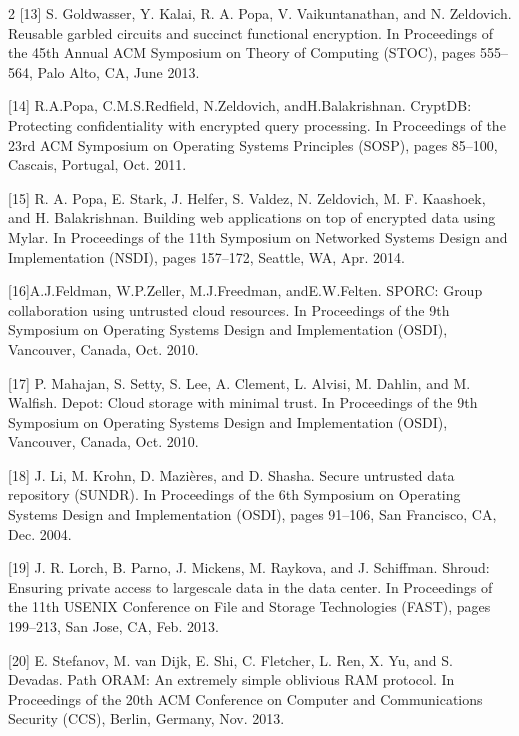 \documentclass[12pt,a4paper]{article}
\begin{document}
\begin{multicols}{2}
[13] S. Goldwasser, Y. Kalai, R. A. Popa, V. Vaikuntanathan, and N. Zeldovich. Reusable garbled circuits and succinct functional encryption. In Proceedings of the 45th Annual ACM Symposium on Theory of Computing (STOC), pages 555–564, Palo Alto, CA, June 2013.

[14] R.A.Popa, C.M.S.Redfield, N.Zeldovich, andH.Balakrishnan. CryptDB: Protecting confidentiality with encrypted query processing. In Proceedings of the 23rd ACM Symposium on Operating Systems Principles (SOSP), pages 85–100, Cascais, Portugal, Oct. 2011.

[15] R. A. Popa, E. Stark, J. Helfer, S. Valdez, N. Zeldovich, M. F. Kaashoek, and H. Balakrishnan. Building web applications on top of encrypted data using Mylar. In Proceedings of the 11th Symposium on Networked Systems Design and Implementation (NSDI), pages 157–172, Seattle, WA, Apr. 2014.

[16]A.J.Feldman, W.P.Zeller, M.J.Freedman, andE.W.Felten. SPORC: Group collaboration using untrusted cloud resources. In Proceedings of the 9th Symposium on Operating Systems Design and Implementation (OSDI), Vancouver, Canada, Oct. 2010.

[17] P. Mahajan, S. Setty, S. Lee, A. Clement, L. Alvisi, M. Dahlin, and M. Walfish. Depot: Cloud storage with minimal trust. In Proceedings of the 9th Symposium on Operating Systems Design and Implementation (OSDI), Vancouver, Canada, Oct. 2010.

[18] J. Li, M. Krohn, D. Mazières, and D. Shasha. Secure untrusted data repository (SUNDR). In Proceedings of the 6th Symposium on Operating Systems Design and Implementation (OSDI), pages 91–106, San Francisco, CA, Dec. 2004.

[19] J. R. Lorch, B. Parno, J. Mickens, M. Raykova, and J. Schiffman. Shroud: Ensuring private access to largescale data in the data center. In Proceedings of the 11th USENIX Conference on File and Storage Technologies (FAST), pages 199–213, San Jose, CA, Feb. 2013.

[20] E. Stefanov, M. van Dijk, E. Shi, C. Fletcher, L. Ren, X. Yu, and S. Devadas. Path ORAM: An extremely simple oblivious RAM protocol. In Proceedings of the 20th ACM Conference on Computer and Communications Security (CCS), Berlin, Germany, Nov. 2013.
\end{multicols}
\end{document}
